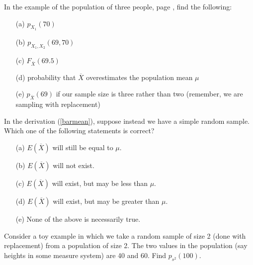 \oneproblem
In the example of the population of three people, page \pageref{threeyahn}, 
find the following:

\begin{itemize}

\item [(a)] $p_{X_1}(70)$

\item [(b)] $p_{X_1,X_2}(69,70)$

\item [(c)] $F_{\overline{X}}(69.5)$

\item [(d)] probability that $\overline{X}$ overestimates the population
mean $\mu$ 

\item [(e)] $p_{\overline{X}}(69)$ if our sample size is three
rather than two (remember, we are sampling with replacement)

\end{itemize}

\oneproblem
In the derivation (\ref{barmean}), suppose instead we have a simple 
random sample.  Which one of the following statements is correct?

\begin{itemize}

\item [(a)] $E(\overline{X})$ will still be equal to $\mu$.

\item [(b)] $E(\overline{X})$ will not exist.

\item [(c)] $E(\overline{X})$ will exist, but may be less than $\mu$.

\item [(d)] $E(\overline{X})$ will exist, but may be greater than $\mu$.

\item [(e)] None of the above is necessarily true.

\end{itemize}

\oneproblem
Consider a toy example in which we take a random sample of
size 2 (done with replacement) from a population of size 2.  The two
values in the population (say heights in some measure system) are 40 and
60.  Find $p_{s^2}(100)$.

